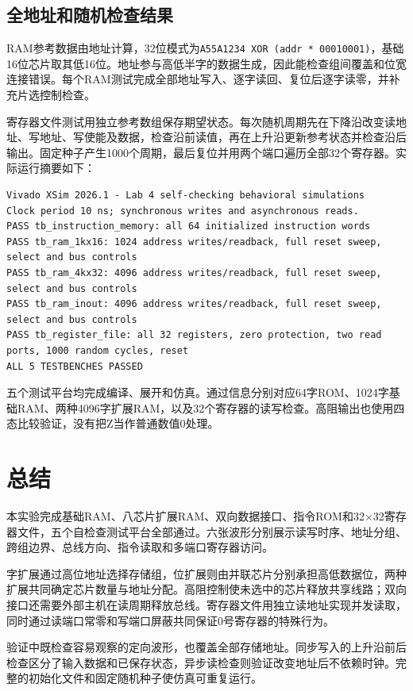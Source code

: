 \documentclass[12pt,a4paper]{ctexart}
\begin{document}
\subsection{全地址和随机检查结果}
RAM参考数据由地址计算，32位模式为\texttt{A55A1234 XOR (addr * 00010001)}，基础16位芯片取其低16位。地址参与高低半字的数据生成，因此能检查组间覆盖和位宽连接错误。每个RAM测试完成全部地址写入、逐字读回、复位后逐字读零，并补充片选控制检查。

寄存器文件测试用独立参考数组保存期望状态。每次随机周期先在下降沿改变读地址、写地址、写使能及数据，检查沿前读值，再在上升沿更新参考状态并检查沿后输出。固定种子产生1000个周期，最后复位并用两个端口遍历全部32个寄存器。实际运行摘要如下：
\begin{lstlisting}[language={}]
Vivado XSim 2026.1 - Lab 4 self-checking behavioral simulations
Clock period 10 ns; synchronous writes and asynchronous reads.
PASS tb_instruction_memory: all 64 initialized instruction words
PASS tb_ram_1kx16: 1024 address writes/readback, full reset sweep, select and bus controls
PASS tb_ram_4kx32: 4096 address writes/readback, full reset sweep, select and bus controls
PASS tb_ram_inout: 4096 address writes/readback, full reset sweep, select and bus controls
PASS tb_register_file: all 32 registers, zero protection, two read ports, 1000 random cycles, reset
ALL 5 TESTBENCHES PASSED
\end{lstlisting}
五个测试平台均完成编译、展开和仿真。通过信息分别对应64字ROM、1024字基础RAM、两种4096字扩展RAM，以及32个寄存器的读写检查。高阻输出也使用四态比较验证，没有把Z当作普通数值0处理。

\section{总结}
本实验完成基础RAM、八芯片扩展RAM、双向数据接口、指令ROM和32$\times$32寄存器文件，五个自检查测试平台全部通过。六张波形分别展示读写时序、地址分组、跨组边界、总线方向、指令读取和多端口寄存器访问。

字扩展通过高位地址选择存储组，位扩展则由并联芯片分别承担高低数据位，两种扩展共同确定芯片数量与地址分配。高阻控制使未选中的芯片释放共享线路；双向接口还需要外部主机在读周期释放总线。寄存器文件用独立读地址实现并发读取，同时通过读端口常零和写端口屏蔽共同保证0号寄存器的特殊行为。

验证中既检查容易观察的定向波形，也覆盖全部存储地址。同步写入的上升沿前后检查区分了输入数据和已保存状态，异步读检查则验证改变地址后不依赖时钟。完整的初始化文件和固定随机种子使仿真可重复运行。

\clearpage
\end{document}
